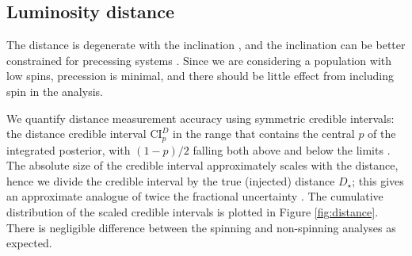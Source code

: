 \subsection{Luminosity distance}\label{sec:distance}

The distance is degenerate with the inclination \citep{Cutler_1994,Aasi_2013}, and the inclination can be better constrained for precessing systems \citep{van_der_Sluys_2008,Vitale_2014}. Since we are considering a population with low spins, precession is minimal, and there should be little effect from including spin in the analysis.

We quantify distance measurement accuracy using symmetric credible intervals: the distance credible interval $\mathrm{CI}_p^{D}$ in the range that contains the central $p$ of the integrated posterior, with $(1-p)/2$ falling both above and below the limits \citep{Aasi_2013}. The absolute size of the credible interval approximately scales with the distance, hence we divide the credible interval by the true (injected) distance $D_\star$; this gives an approximate analogue of twice the fractional uncertainty \citep{Berry_2014}. The cumulative distribution of the scaled credible intervals is plotted in Figure \ref{fig:distance}. There is negligible difference between the spinning and non-spinning analyses as expected.


  
  